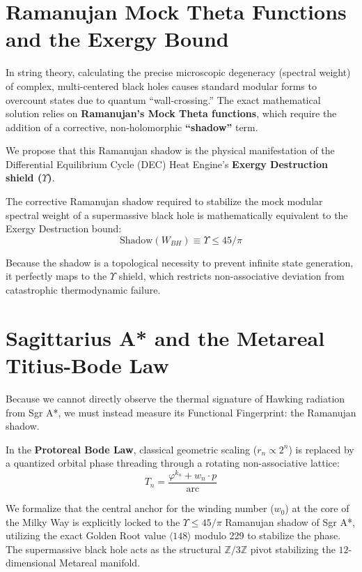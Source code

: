 \section{Ramanujan Mock Theta Functions and the Exergy Bound}
In string theory, calculating the precise microscopic degeneracy (spectral weight) of complex, multi-centered black holes causes standard modular forms to overcount states due to quantum ``wall-crossing.'' The exact mathematical solution relies on \textbf{Ramanujan's Mock Theta functions}, which require the addition of a corrective, non-holomorphic \textbf{``shadow''} term.

We propose that this Ramanujan shadow is the physical manifestation of the Differential Equilibrium Cycle (DEC) Heat Engine's \textbf{Exergy Destruction shield ($\Upsilon$)}. 

\begin{theorem}
The corrective Ramanujan shadow required to stabilize the mock modular spectral weight of a supermassive black hole is mathematically equivalent to the Exergy Destruction bound:
$$ \text{Shadow}(W_{BH}) \equiv \Upsilon \leq 45/\pi $$
\end{theorem}

Because the shadow is a topological necessity to prevent infinite state generation, it perfectly maps to the $\Upsilon$ shield, which restricts non-associative deviation from catastrophic thermodynamic failure.

\section{Sagittarius A* and the Metareal Titius-Bode Law}
Because we cannot directly observe the thermal signature of Hawking radiation from Sgr A*, we must instead measure its Functional Fingerprint: the Ramanujan shadow.

In the \textbf{Protoreal Bode Law}, classical geometric scaling ($r_n \propto 2^n$) is replaced by a quantized orbital phase threading through a rotating non-associative lattice:
$$ T_n = \frac{\varphi^{k_n} + w_n \cdot p}{\text{arc}} $$

We formalize that the central anchor for the winding number ($w_0$) at the core of the Milky Way is explicitly locked to the $\Upsilon \leq 45/\pi$ Ramanujan shadow of Sgr A*, utilizing the exact Golden Root value $\langle 148 \rangle$ modulo 229 to stabilize the phase. The supermassive black hole acts as the structural $\mathbb{Z}/3\mathbb{Z}$ pivot stabilizing the $12$-dimensional Metareal manifold.

